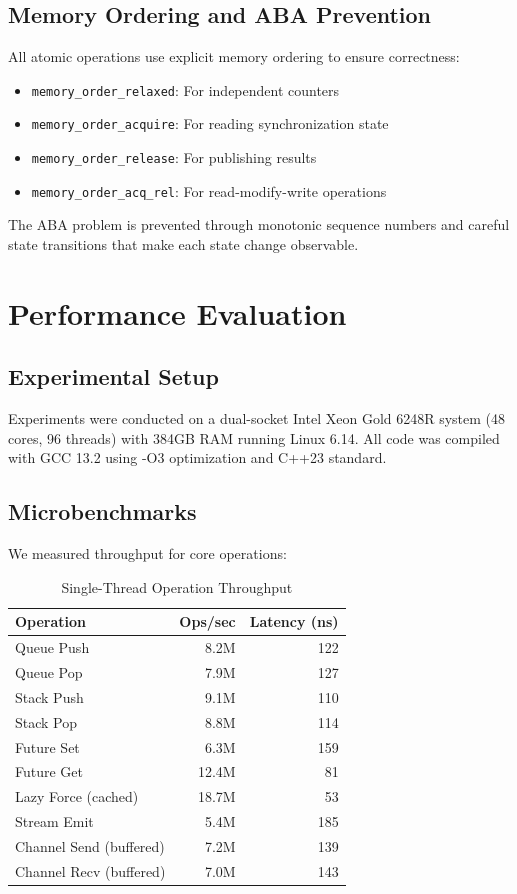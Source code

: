 \documentclass[10pt,conference]{IEEEtran}
\begin{document}
\subsection{Memory Ordering and ABA Prevention}

All atomic operations use explicit memory ordering to ensure correctness:

\begin{itemize}
\item \texttt{memory\_order\_relaxed}: For independent counters
\item \texttt{memory\_order\_acquire}: For reading synchronization state
\item \texttt{memory\_order\_release}: For publishing results
\item \texttt{memory\_order\_acq\_rel}: For read-modify-write operations
\end{itemize}

The ABA problem is prevented through monotonic sequence numbers and careful state transitions that make each state change observable.

\section{Performance Evaluation}

\subsection{Experimental Setup}

Experiments were conducted on a dual-socket Intel Xeon Gold 6248R system (48 cores, 96 threads) with 384GB RAM running Linux 6.14. All code was compiled with GCC 13.2 using -O3 optimization and C++23 standard.

\subsection{Microbenchmarks}

We measured throughput for core operations:

\begin{table}[h]
\centering
\caption{Single-Thread Operation Throughput}
\label{tab:throughput}
\begin{tabular}{lrr}
\toprule
Operation & Ops/sec & Latency (ns) \\
\midrule
Queue Push & 8.2M & 122 \\
Queue Pop & 7.9M & 127 \\
Stack Push & 9.1M & 110 \\
Stack Pop & 8.8M & 114 \\
Future Set & 6.3M & 159 \\
Future Get & 12.4M & 81 \\
Lazy Force (cached) & 18.7M & 53 \\
Stream Emit & 5.4M & 185 \\
Channel Send (buffered) & 7.2M & 139 \\
Channel Recv (buffered) & 7.0M & 143 \\
\bottomrule
\end{tabular}
\end{table}
\end{document}
